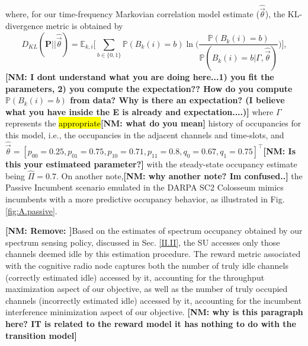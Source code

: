 \documentclass[12pt, draftcls, onecolumn]{IEEEtran}
\newcommand{\nm}[1]{{\color{blue}\bf{[NM: #1]}}}
\begin{document}
where, for our time-frequency Markovian correlation model estimate ($\hat{\vec{\theta}}$), the KL-divergence metric is obtained by
\begin{equation}
    D_{KL}(\mathbf{P}{||}\hat{\vec{\theta}}) = \mathbb{E}_{k,i}\Bigg[\sum_{b{\in}\{0,1\}}\mathbb{P}(B_{k}(i){=}b)\ln\Bigg(\frac{\mathbb{P}(B_{k}(i){=}b)}{\mathbb{P}(B_{k}(i){=}b|\Gamma, \hat{\vec{\theta}})}\Bigg)\Bigg],
\end{equation}
\nm{I dont understand what you are doing here...1) you fit the parameters, 2) you compute the expectation?? How do you compute $\mathbb{P}(B_{k}(i){=}b)$ from data? Why is there an expectation? (I believe what you have inside the E is already and expectation....)}
where $\Gamma$ represents the \hl{appropriate}\nm{what do you mean} history of occupancies for this model, i.e., the occupancies in the adjacent channels and time-slots, and $\hat{\vec{\theta}} = [p_{00}=0.25,p_{01}=0.75,p_{10}=0.71,p_{11}=0.8,q_{0}=0.67,q_{1}=0.75]^{\intercal}$\nm{Is this your estimateed parameter?} with the steady-state occupancy estimate being $\hat{\Pi}{=}0.7$. On another note,\nm{why another note? Im confused..} the Passive Incumbent scenario \cite{DARPA:SC2pi} emulated in the DARPA SC2 Colosseum mimics incumbents with a more predictive occupancy behavior, as illustrated in Fig. \ref{fig:A.passive}.

\nm{Remove: }Based on the estimates of spectrum occupancy obtained by our spectrum sensing policy, discussed in Sec. \ref{II.II}, the SU accesses only those channels deemed idle by this estimation procedure. The reward metric associated with the cognitive radio node captures both the number of truly idle channels (correctly estimated idle) accessed by it, accounting for the throughput maximization aspect of our objective, as well as the number of truly occupied channels (incorrectly estimated idle) accessed by it, accounting for the incumbent interference minimization aspect of our objective.
\nm{why is this paragraph here? IT is related to the reward model it has nothing to do with the transition model}
\end{document}
